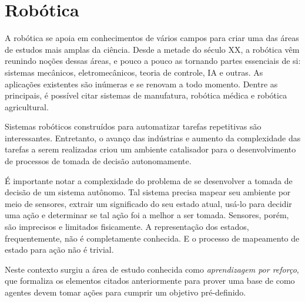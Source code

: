 \section{Robótica}
\par A robótica se apoia em conhecimentos de vários campos para criar uma das áreas de estudos mais amplas da ciência. Desde a metade do século XX, a robótica vêm reunindo noções dessas áreas, e pouco a pouco as tornando partes essenciais de si: sistemas mecânicos, eletromecânicos, teoria de controle, IA e outras. As aplicações existentes são inúmeras e se renovam a todo momento. Dentre as principais, é possível citar sistemas de manufatura, robótica médica e robótica agricultural. \cite{handbook2007} 
\par Sistemas robóticos construídos para automatizar tarefas repetitivas são interessantes. Entretanto, o avanço das indústrias e aumento da complexidade das tarefas a serem realizadas criou um ambiente catalisador para o desenvolvimento de processos de tomada de decisão autonomamente. 
\par É importante notar a complexidade do problema de se desenvolver a tomada de decisão de um sistema autônomo. Tal sistema precisa mapear seu ambiente por meio de sensores, extrair um significado do seu estado atual, usá-lo para decidir uma ação e determinar se tal ação foi a melhor a ser tomada. Sensores, porém, são imprecisos e limitados fisicamente. A representação dos estados, frequentemente, não é completamente conhecida. E o processo de mapeamento de estado para ação não é trivial.
\par Neste contexto surgiu a área de estudo conhecida como \textit{aprendizagem por reforço}, que formaliza os elementos citados anteriormente para prover uma base de como agentes devem tomar ações para cumprir um objetivo pré-definido. \cite{sutton2018reinforcement}



